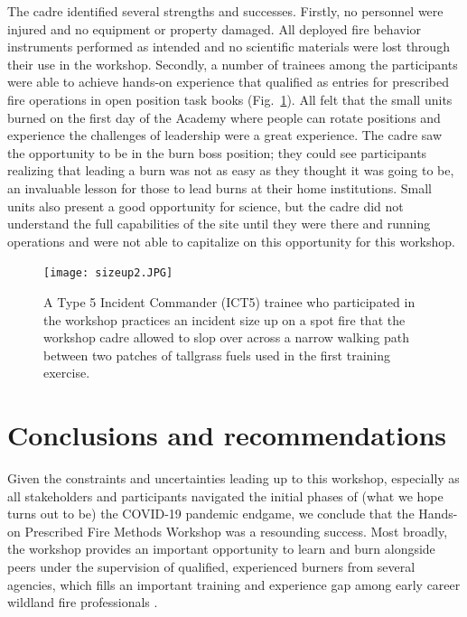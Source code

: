 \documentclass[fire,article,submit,moreauthors,pdftex]{Definitions/mdpi}
\begin{document}
The cadre identified several strengths and successes.
Firstly, no personnel were injured and no equipment or property damaged.
All deployed fire behavior instruments performed as intended and no scientific materials were lost through their use in the workshop.
Secondly, a number of trainees among the participants were able to achieve hands-on experience that qualified as entries for prescribed fire operations in open position task books (Fig.~\ref{sizeup}).
All felt that the small units burned on the first day of the Academy where people can rotate positions and experience the challenges of leadership were a great experience.
The cadre saw the opportunity to be in the burn boss position; they could see participants realizing that leading a burn was not as easy as they thought it was going to be, an invaluable lesson for those to lead burns at their home institutions.
Small units also present a good opportunity for science, but the cadre did not understand the full capabilities of the site until they were there and running operations and were not able to capitalize on this opportunity for this workshop.

\begin{figure}
\centering
\texttt{[image: sizeup2.JPG]}
\caption{A Type 5 Incident Commander (ICT5) trainee who participated in the workshop practices an incident size up on a spot fire that the workshop cadre allowed to slop over across a narrow walking path between two patches of tallgrass fuels used in the first training exercise. \label{sizeup}}
\end{figure}

\section{Conclusions and recommendations}

Given the constraints and uncertainties leading up to this workshop, especially as all stakeholders and participants navigated the initial phases of (what we hope turns out to be) the COVID-19 pandemic endgame, we conclude that the Hands-on Prescribed Fire Methods Workshop was a resounding success.
Most broadly, the workshop provides an important opportunity to learn and burn alongside peers under the supervision of qualified, experienced burners from several agencies, which fills an important training and experience gap among early career wildland fire professionals \citep{kobziar2009}.
\end{document}
